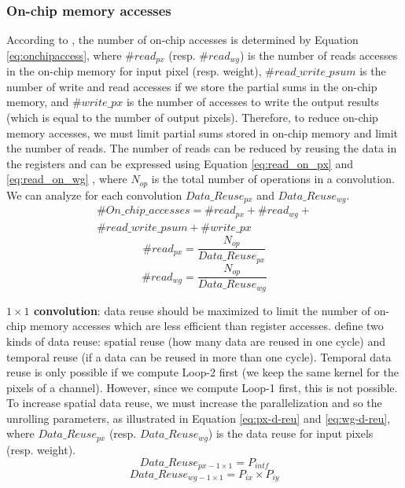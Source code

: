 \subsubsection{On-chip memory accesses}
%
According to \textcite{ma_optimizing_2018}, the number of on-chip accesses is determined by Equation \eqref{eq:onchipaccess}, where $\#read_{px}$ (resp. $\#read_{wg}$) is the number of reads accesses in the on-chip memory for input pixel (resp. weight), $\#read\_write\_psum$ is the number of write and read accesses if we store the partial sums in the on-chip memory, and  $\#write\_px$ is the number of accesses to write the output results (which is equal to the number of output pixels). Therefore, to reduce on-chip memory accesses, we must limit partial sums stored in on-chip memory and limit the number of reads.
The number of reads can be reduced by reusing the data in the registers and can be expressed using Equation \ref{eq:read_on_px} and \ref{eq:read_on_wg} \cite{ma_optimizing_2018}, where $N_{op}$ is the total number of operations in a convolution. We can analyze for each convolution $Data\_Reuse_{px}$ and $Data\_Reuse_{wg}$.
%
\begin{multline}
    \#On\_chip\_accesses = \#read_{px} + \#read_{wg} + \\ \#read\_write\_psum + \#write\_px
    \label{eq:onchipaccess}
\end{multline}
%
\begin{equation}
    \#read_{px} = \frac{N_{op}}{Data\_Reuse_{px}}
    \label{eq:read_on_px}
\end{equation}
%
\begin{equation}
    \#read_{wg} = \frac{N_{op}}{Data\_Reuse_{wg}}
    \label{eq:read_on_wg}
\end{equation}

\textbf{$1 \times 1$ convolution}: data reuse should be maximized to limit the number of on-chip memory accesses which are less efficient than register accesses. \textcite{ma_optimizing_2018} define two kinds of data reuse: spatial reuse (how many data are reused in one cycle) and temporal reuse (if a data can be reused in more than one cycle). Temporal data reuse is only possible if we compute Loop-2 first (we keep the same kernel for the pixels of a channel). However, since we compute Loop-1 first, this is not possible. To increase spatial data reuse, we must increase the parallelization and so the unrolling parameters, as illustrated in Equation \eqref{eq:px-d-reu} and \eqref{eq:wg-d-reu}, where $Data\_Reuse_{px}$ (resp. $Data\_Reuse_{wg}$) is the data reuse for input pixels (resp. weight).
%
\begin{equation}
    Data\_Reuse_{px - 1 \times 1} = P_{intf}
    \label{eq:px-d-reu}
\end{equation}
\begin{equation}
    Data\_Reuse_{wg - 1 \times 1} = P_{ix} \times P_{iy}
    \label{eq:wg-d-reu}
\end{equation}

